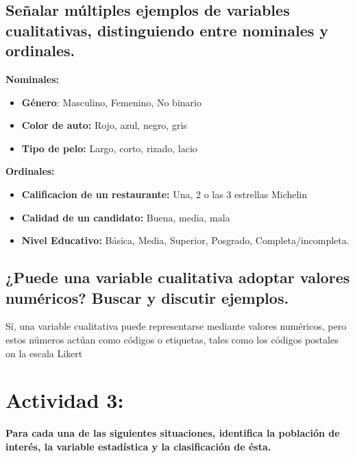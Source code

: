 \documentclass[12pt, letterpaper]{article}
\begin{document}
\subsection{Señalar múltiples ejemplos de variables cualitativas, distinguiendo entre nominales y ordinales.}
\textbf{Nominales:}
\begin{itemize}
    \item \textbf{Género}: Masculino, Femenino, No binario
    \item \textbf{Color de auto:} Rojo, azul, negro, gris 
    \item \textbf{Tipo de pelo:} Largo, corto, rizado, lacio
\end{itemize}

\textbf{Ordinales:}
\begin{itemize}
    \item \textbf{Calificacion de un restaurante:} Una, 2 o las 3 estrellas Michelin
    \item \textbf{Calidad de un candidato:} Buena, media, mala
    \item \textbf{Nivel Educativo:} Básica, Media, Superior, Posgrado, Completa/incompleta.
\end{itemize}

\subsection{¿Puede una variable cualitativa adoptar valores numéricos? Buscar y discutir ejemplos.}
Sí, una variable cualitativa puede representarse mediante valores numéricos, pero estos números actúan como códigos o etiquetas, tales como los códigos postales on la escala Likert


\section{Actividad 3:} 
\textbf{Para cada una de las siguientes situaciones, identifica la población de interés, la variable estadística y la clasificación de ésta.}
\end{document}
